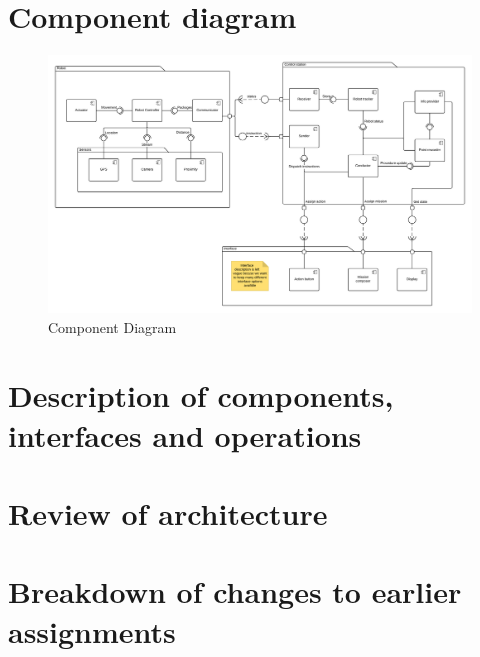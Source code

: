 \section*{Component diagram}
\begin{figure}[H]
    \centering
    \includegraphics[width=22cm, angle=-90]{docs/assignments/Assignment_2/components.png}
    \caption{Component Diagram}
\end{figure}
\section*{Description of components, interfaces and operations}

\section*{Review of architecture}


\section*{Breakdown of changes to earlier assignments} \label{deltas}
